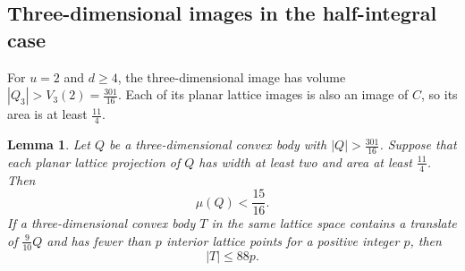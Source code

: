 \documentclass[reqno, 11pt]{article}
\numberwithin{equation}{section}
\newtheorem{lemma}[lemma]{Lemma}
\theoremstyle{definition}
\begin{document}
\subsection{Three-dimensional images in the half-integral case}

For $u=2$ and $d\ge4$, the three-dimensional image has volume
$|Q_3|>V_3(2)=\frac{301}{16}$. Each of its planar lattice images
is also an image of $C$, so its area is at least $\frac{11}{4}$.

\begin{lemma}\label{lem:half-three-image}
Let $Q$ be a three-dimensional convex body with $|Q|>\frac{301}{16}$.
Suppose that each planar lattice projection of $Q$ has width at
least two and area at least $\frac{11}{4}$. Then
\begin{equation}\label{eq:rat-half-radius-three}
                           \mu(Q)<\frac{15}{16}.
\end{equation}
If a three-dimensional convex body $T$ in the same lattice space
contains a translate of $\frac{9}{10}Q$ and has fewer than $p$ interior
lattice points for a positive integer $p$, then
\begin{equation}\label{eq:rat-thick-three}
                               |T|\le88p.
\end{equation}
\end{lemma}
\end{document}
